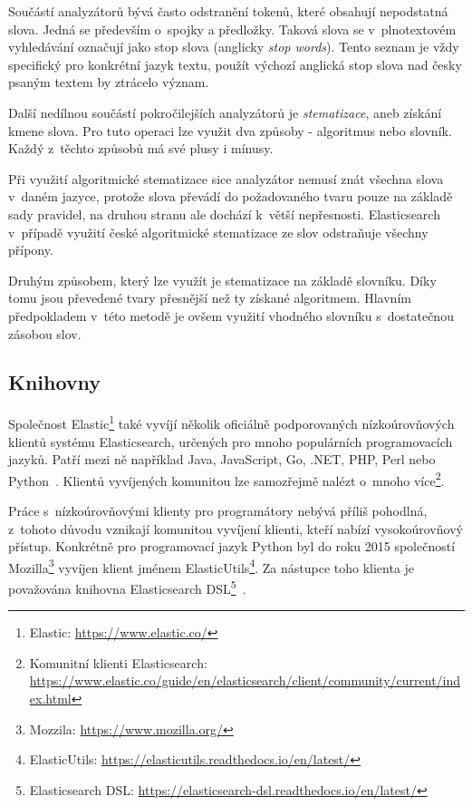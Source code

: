 Součástí analyzátorů bývá často odstranění tokenů, které obsahují nepodstatná slova. Jedná se především o~spojky a předložky. Taková slova se v~plnotextovém vyhledávání označují jako {stop slova} (anglicky \emph{stop words}). Tento seznam je vždy specifický pro konkrétní jazyk textu, použít výchozí anglická stop slova nad česky psaným textem by ztrácelo význam.

Další nedílnou součástí pokročilejších analyzátorů je \emph{stematizace}, aneb získání kmene slova. Pro tuto operaci lze využit dva způsoby - algoritmus nebo slovník. Každý z~těchto způsobů má své plusy i mínusy.

Při využití algoritmické stematizace sice analyzátor nemusí znát všechna slova v~daném jazyce, protože slova převádí do požadovaného tvaru pouze na základě sady pravidel, na druhou stranu ale dochází k~větší nepřesnosti. Elasticsearch v~případě využití české algoritmické stematizace ze slov odstraňuje všechny přípony.

Druhým způsobem, který lze využít je stematizace na základě slovníku. Díky tomu jsou převedené tvary přesnější než ty získané algoritmem. Hlavním předpokladem v~této metodě je ovšem využití vhodného slovníku s~dostatečnou zásobou slov.


\subsection{Knihovny}
Společnost Elastic\footnote{Elastic: \url{https://www.elastic.co/}} také vyvíjí několik oficiálně podporovaných nízkoúrovňových klientů systému Elasticsearch, určených pro mnoho populárních programovacích jazyků. Patří mezi ně například Java, JavaScript, Go, .NET, PHP, Perl nebo Python~\cite{bib:elastic-clients}.
Klientů vyvíjených komunitou lze samozřejmě nalézt o~mnoho více\footnote{Komunitní klienti Elasticsearch: \url{https://www.elastic.co/guide/en/elasticsearch/client/community/current/index.html}}.

Práce s~nízkoúrovňovými klienty pro programátory nebývá příliš pohodlná, z~tohoto důvodu vznikají komunitou vyvíjení klienti, kteří nabízí vysokoúrovňový přístup. Konkrétně pro programovací jazyk Python byl do roku 2015 společností Mozilla\footnote{Mozzila: \url{https://www.mozilla.org/}} vyvíjen klient jménem ElasticUtils\footnote{ElasticUtils: \url{https://elasticutils.readthedocs.io/en/latest/}}. Za nástupce toho klienta je považována knihovna Elasticsearch DSL\footnote{Elasticsearch DSL: \url{https://elasticsearch-dsl.readthedocs.io/en/latest/}}~\cite{bib:elastic-utils}.

